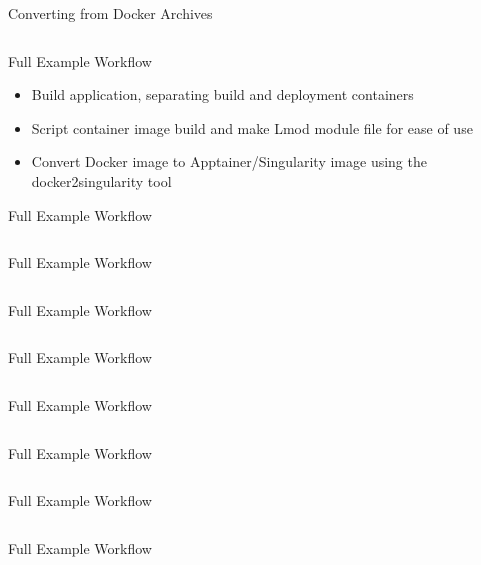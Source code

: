 \documentclass[aspectratio=169]{beamer}
\begin{document}
\begin{frame}{Converting from Docker Archives}
\inputminted[firstline=15, lastline=20]{sh}{src/build_python3_docker.sh}
\end{frame}

\begin{frame}{Full Example Workflow}
\begin{itemize}
\item Build application, separating build and deployment containers
\item Script container image build and make Lmod module file for ease of use
\item Convert Docker image to Apptainer/Singularity image using the docker2singularity tool
\end{itemize}
\end{frame}

\begin{frame}{Full Example Workflow}
\inputminted[firstline=1, lastline=18]{Dockerfile}{src/molden/Dockerfile}
\end{frame}

\begin{frame}{Full Example Workflow}
\inputminted[firstline=20, lastline=32]{Dockerfile}{src/molden/Dockerfile}
\end{frame}

\begin{frame}{Full Example Workflow}
\inputminted[firstline=34, lastline=48]{Dockerfile}{src/molden/Dockerfile}
\end{frame}

\begin{frame}{Full Example Workflow}
\inputminted[firstline=1, lastline=11]{sh}{src/molden/build_images.sh}
\end{frame}

\begin{frame}{Full Example Workflow}
\inputminted[firstline=13, lastline=21]{sh}{src/molden/build_images.sh}
\end{frame}

\begin{frame}{Full Example Workflow}
\inputminted[firstline=23, lastline=28]{sh}{src/molden/build_images.sh}
\end{frame}

\begin{frame}{Full Example Workflow}
\inputminted[firstline=30, lastline=34]{sh}{src/molden/build_images.sh}
\end{frame}

\begin{frame}{Full Example Workflow}
\inputminted[firstline=36, lastline=43]{sh}{src/molden/build_images.sh}
\end{frame}
\end{document}
